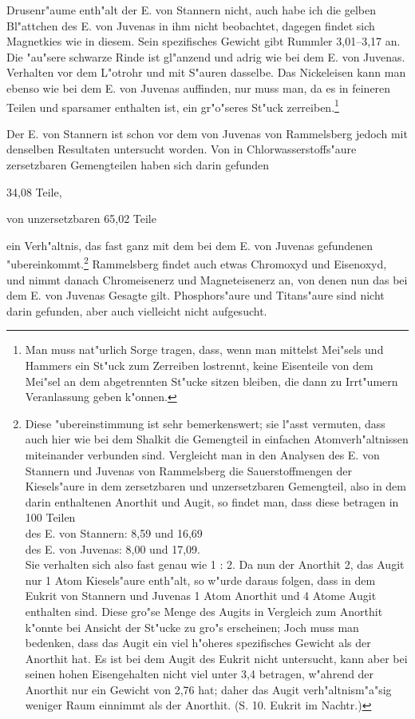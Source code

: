 \documentclass[a4paper, 11pt, oneside]{article}
\begin{document}
Drusenr"aume enth"alt der E. von Stannern nicht, auch habe ich die gelben Bl"attchen des E. von Juvenas in ihm nicht beobachtet, dagegen findet sich Magnetkies wie in diesem. Sein spezifisches Gewicht gibt Rummler 3,01--3,17 an. Die "au"sere schwarze Rinde ist gl"anzend und adrig wie bei dem E. von Juvenas. Verhalten vor dem L"otrohr und mit S"auren dasselbe. Das Nickeleisen kann man ebenso wie bei dem E. von Juvenas auffinden, nur muss man, da es in feineren Teilen und sparsamer enthalten ist, ein gr"o"seres St"uck zerreiben.\footnote{Man muss nat"urlich Sorge tragen, dass, wenn man mittelst Mei"sels und Hammers ein St"uck zum Zerreiben lostrennt, keine Eisenteile von dem Mei"sel an dem abgetrennten St"ucke sitzen bleiben, die dann zu Irrt"umern Veranlassung geben k"onnen.}

Der E. von Stannern ist schon vor dem von Juvenas von Rammelsberg jedoch mit denselben Resultaten untersucht worden. Von in Chlorwasserstoffs"aure zersetzbaren Gemengteilen haben sich darin gefunden
\begin{center}
34,08 Teile,
\end{center}
\begin{center}
von unzersetzbaren 65,02 Teile
\end{center}
ein Verh"altnis, das fast ganz mit dem bei dem E. von Juvenas gefundenen "ubereinkommt.\footnote{Diese "ubereinstimmung ist sehr bemerkenswert; sie l"asst vermuten, dass auch hier wie bei dem Shalkit die Gemengteil in einfachen Atomverh"altnissen miteinander verbunden sind. Vergleicht man in den Analysen des E. von Stannern und Juvenas von Rammelsberg die Sauerstoffmengen der Kiesels"aure in dem zersetzbaren und unzersetzbaren Gemengteil, also in dem darin enthaltenen Anorthit und Augit, so findet man, dass diese betragen in 100 Teilen\\
des E. von Stannern: 8,59 und 16,69\\
des E. von Juvenas: 8,00 und 17,09.\\
Sie verhalten sich also fast genau wie 1 : 2. Da nun der Anorthit 2, das Augit nur 1 Atom Kiesels"aure enth"alt, so w"urde daraus folgen, dass in dem Eukrit von Stannern und Juvenas 1 Atom Anorthit und 4 Atome Augit enthalten sind. Diese gro"se Menge des Augits in Vergleich zum Anorthit k"onnte bei Ansicht der St"ucke zu gro"s erscheinen; Joch muss man bedenken, dass das Augit ein viel h"oheres spezifisches Gewicht als der Anorthit hat. Es ist bei dem Augit des Eukrit nicht untersucht, kann aber bei seinen hohen Eisengehalten nicht viel unter 3,4 betragen, w"ahrend der Anorthit nur ein Gewicht von 2,76 hat; daher das Augit verh"altnism"a"sig weniger Raum einnimmt als der Anorthit. (S. 10. Eukrit im Nachtr.)} Rammelsberg findet auch etwas Chromoxyd und Eisenoxyd, und nimmt danach Chromeisenerz und Magneteisenerz an, von denen nun das bei dem E. von Juvenas Gesagte gilt. Phosphors"aure und Titans"aure sind nicht darin gefunden, aber auch vielleicht nicht aufgesucht.
\end{document}
